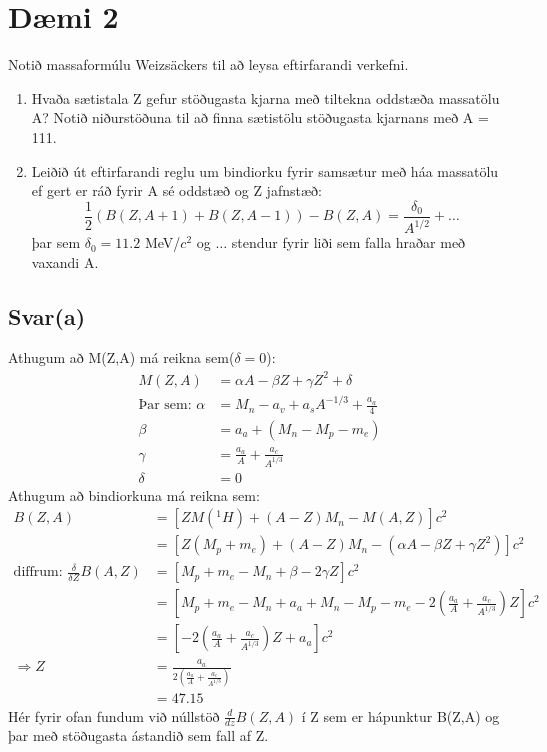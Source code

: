 \documentclass[11pt]{article}
\begin{document}
\section*{Dæmi 2}
Notið massaformúlu Weizsäckers til að leysa eftirfarandi verkefni.
\begin{enumerate}[label=(\alph*)]
    \item Hvaða sætistala Z gefur stöðugasta kjarna með tiltekna oddstæða massatölu A? Notið niðurstöðuna til að finna sætistölu stöðugasta kjarnans með A = 111.
    \item Leiðið út eftirfarandi reglu um bindiorku fyrir samsætur með háa massatölu ef gert er ráð fyrir A sé oddstæð og Z jafnstæð: $$\frac { 1 } { 2 } ( B ( Z , A + 1 ) + B ( Z , A - 1 ) ) - B ( Z , A ) = \frac { \delta _ { 0 } } { A ^ { 1 / 2 } } + \ldots$$ þar sem $\delta_0 = 11.2$ MeV/$c^2$ og $\ldots$ stendur fyrir liði sem falla hraðar með vaxandi A.
\end{enumerate}


\subsection*{Svar(a)}
Athugum að M(Z,A) má reikna sem($\delta = 0$):
\begin{align*}
    M(Z,A) &= \alpha A - \beta Z + \gamma Z^2 + \delta\\
    \text{Þar sem:   } \alpha  &= M_n -a_v +a_sA^{-1/3} + \frac{a_a}{4}\\
                    \beta   &= a_a + (M_n - M_p - m_e)\\
                    \gamma  &= \frac{a_a}{A} + \frac{a_c}{A^{1/3}}\\
                    \delta  &= 0
\end{align*}
Athugum að bindiorkuna má reikna sem:
\begin{align*}
    B(Z,A)                                      &= [ZM(^1H) + (A-Z)M_n - M(A,Z)]c^2\\
                                                &= [Z(M_p + m_e) + (A-Z)M_n - (\alpha A - \beta Z + \gamma Z^2)]c^2\\
\text{diffrum: }\frac{\delta}{\delta Z}B(A,Z)   &=[M_p + m_e -M_n + \beta - 2\gamma Z]c^2\\
                                                &=\left[M_p + m_e -M_n + a_a + M_n - M_p - m_e - 2\left(\frac{a_a}{A}+\frac{a_c}{A^{1/3}} \right)Z\right]c^2\\
                                                &=\left[-2\left(\frac{a_a}{A}+\frac{a_c}{A^{1/3}} \right)Z+a_a\right]c^2\\
                                \Rightarrow Z   &= \frac{a_a}{2\left(\frac{a_a}{A}+\frac{a_c}{A^{1/3}} \right)} \\
                                                &= 47.15
\end{align*}
Hér fyrir ofan fundum við núllstöð $\frac{d}{dz} B(Z,A)$ í Z sem er hápunktur B(Z,A) og þar með stöðugasta ástandið sem fall af Z.
\end{document}
